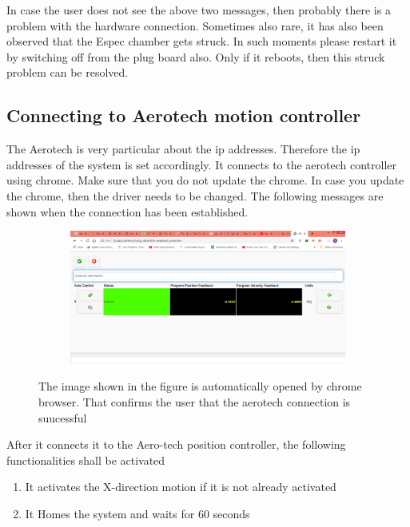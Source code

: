 \documentclass[12pt]{article}
\begin{document}
 In case the user does not see the above two messages, then probably there is a problem with the hardware connection. Sometimes also rare, it has also been observed that the Espec chamber gets struck. In such moments please restart it by switching off from the plug board also. Only if it reboots, then this struck problem can be resolved.
 
 \subsection{Connecting to Aerotech motion  controller}
 The Aerotech is very particular about the ip addresses. Therefore the ip addresses of the system is set accordingly. It connects to the aerotech controller using chrome. Make sure that you do not update the chrome. In case you update the chrome, then the driver needs to be changed. The following messages are shown when the connection has been established.
 \begin{figure}[H]
 
    \begin{subfigure}{1.0\textwidth}
    \includegraphics[scale=0.4]{images/aerotech.png} 
    \label{fig:DJp1}
    \end{subfigure}
 \caption{The image shown in the figure is automatically opened by chrome browser. That confirms the user that the aerotech connection is suucessful }
\label{fig6}
\end{figure} 
  
 
 After it connects it to the Aero-tech position controller, the following functionalities shall be activated
 
 \begin{enumerate}
     \item It activates the X-direction motion  if it is not already activated
     \item It Homes the system and waits for 60 seconds
     
 \end{enumerate}
 
\end{document}
